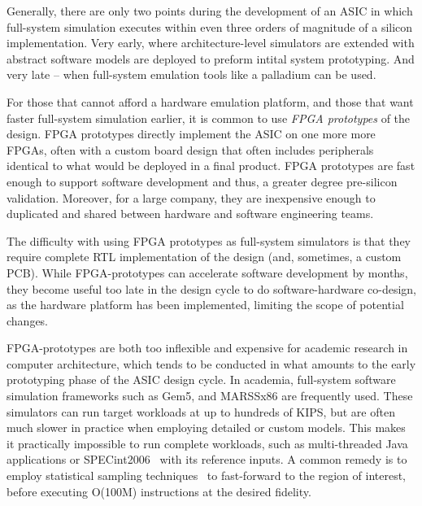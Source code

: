 
Generally, there are only two points during the development of an ASIC in which
full-system simulation executes within even three orders of magnitude of a
silicon implementation. Very early, where architecture-level simulators are
extended with abstract software models are deployed to preform intital system
prototyping. And very late -- when full-system emulation tools like a palladium
can be used.

For those that cannot afford a hardware emulation platform, and those that want
faster full-system simulation earlier, it is common to use \emph{FPGA
prototypes} of the design. FPGA prototypes directly implement the ASIC on one
more more FPGAs, often with a custom board design that often includes
peripherals identical to what would be deployed in a final product. FPGA
prototypes are fast enough to support software development and thus, a greater
degree pre-silicon validation. Moreover, for a large company, they are
inexpensive enough to duplicated and shared between hardware and software
engineering teams.

The difficulty with using FPGA prototypes as full-system simulators is that
they require complete RTL implementation of the design (and, sometimes, a
custom PCB). While FPGA-prototypes can accelerate software development by
months, they become useful too late in the design cycle to do software-hardware
co-design, as the hardware platform has been implemented, limiting the scope of
potential changes.

FPGA-prototypes are both too inflexible and expensive for academic research in
computer architecture, which tends to be conducted in what amounts to the early
prototyping phase of the ASIC design cycle. In academia, full-system software
simulation frameworks such as Gem5\cite{gem5}, and MARSSx86\cite{marssx86} are
frequently used. These simulators can run target workloads at up to hundreds of
KIPS, but are often much slower in practice when employing detailed or custom
models. This makes it practically impossible to run complete workloads, such as
multi-threaded Java applications or SPECint2006~\cite{spec} with its reference
inputs. A common remedy is to employ statistical sampling
techniques~\cite{smarts} to fast-forward to the region of interest, before
executing O(100M) instructions at the desired fidelity.

